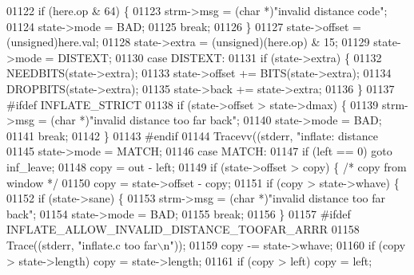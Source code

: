 \begin{DoxyCode}
{{{{{{{{{{{01122             \textcolor{keywordflow}{if} (here.op & 64) \{
01123                 strm->msg = (\textcolor{keywordtype}{char} *)\textcolor{stringliteral}{"invalid distance code"};
01124                 state->mode = BAD;
01125                 \textcolor{keywordflow}{break};
01126             \}
01127             state->offset = (unsigned)here.val;
01128             state->extra = (\textcolor{keywordtype}{unsigned})(here.op) & 15;
01129             state->mode = DISTEXT;
01130         \textcolor{keywordflow}{case} DISTEXT:
01131             \textcolor{keywordflow}{if} (state->extra) \{
01132                 NEEDBITS(state->extra);
01133                 state->offset += BITS(state->extra);
01134                 DROPBITS(state->extra);
01135                 state->back += state->extra;
01136             \}
01137 \textcolor{preprocessor}{#ifdef INFLATE\_STRICT}
01138             \textcolor{keywordflow}{if} (state->offset > state->dmax) \{
01139                 strm->msg = (\textcolor{keywordtype}{char} *)\textcolor{stringliteral}{"invalid distance too far back"};
01140                 state->mode = BAD;
01141                 \textcolor{keywordflow}{break};
01142             \}
01143 \textcolor{preprocessor}{#endif}
01144             Tracevv((stderr, \textcolor{stringliteral}{"inflate:         distance %
01145             state->mode = MATCH;
01146         \textcolor{keywordflow}{case} MATCH:
01147             \textcolor{keywordflow}{if} (left == 0) \textcolor{keywordflow}{goto} inf\_leave;
01148             copy = out - left;
01149             \textcolor{keywordflow}{if} (state->offset > copy) \{         \textcolor{comment}{/* copy from window */}
01150                 copy = state->offset - copy;
01151                 \textcolor{keywordflow}{if} (copy > state->whave) \{
01152                     \textcolor{keywordflow}{if} (state->sane) \{
01153                         strm->msg = (\textcolor{keywordtype}{char} *)\textcolor{stringliteral}{"invalid distance too far back"};
01154                         state->mode = BAD;
01155                         \textcolor{keywordflow}{break};
01156                     \}
01157 \textcolor{preprocessor}{#ifdef INFLATE\_ALLOW\_INVALID\_DISTANCE\_TOOFAR\_ARRR}
01158                     Trace((stderr, \textcolor{stringliteral}{"inflate.c too far\(\backslash\)n"}));
01159                     copy -= state->whave;
01160                     \textcolor{keywordflow}{if} (copy > state->length) copy = state->length;
01161                     \textcolor{keywordflow}{if} (copy > left) copy = left;
}}}}}}}}}}}}
\end{DoxyCode}
